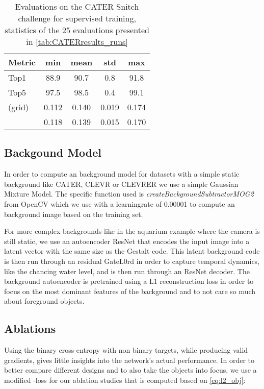 \documentclass{article} \usepackage{iclr2023_conference_arxiv,times}
\begin{document}
\begin{table}[htb]
    \caption{Evaluations on the CATER Snitch challenge for supervised training, statistics of the 25 evaluations presented in \autoref{tab:CATERresults_runs}}
    \centering
    \footnotesize
    \begin{tabularx}{\linewidth}{ l C C C C }
	\toprule
    Metric & min & mean & std & max \\
    \midrule
    Top1 & 88.9 & 90.7 & 0.8 & 91.8 \\
    Top5 & 97.5 & 98.5 & 0.4 & 99.1 \\
     (grid)   &   0.112 & 0.140 & 0.019 & 0.174 \\
       &  0.118 & 0.139 & 0.015 &  0.170 \\
    \bottomrule
    \end{tabularx}
    \label{tab:CATERresults_stats}
\end{table}

\subsection{Backgound Model}\label{app:subsec:background_model}
In order to compute an background model for datasets with a simple static background like CATER, CLEVR or CLEVRER we use a simple Gaussian Mixture Model. The specific function used is \textit{createBackgroundSubtractorMOG2} from OpenCV \cite{opencv_library} which we use with a learningrate of 0.00001 to compute an background image based on the training set.

For more complex backgrounds like in the aquarium example where the camera is still static, we use an autoencoder ResNet that encodes the input image into a latent vector with the same size as the Gestalt code. This latent background code is then run through an residual GateL0rd in order to capture temporal dynamics, like the chancing water level, and is then run through an ResNet decoder.
The background autoencoder is pretrained using a L1 reconstruction loss in order to focus on the most dominant features of the background and to not care so much about foreground objects.




\subsection{Ablations}\label{ablations}

Using the binary cross-entropy with non binary targets, while producing valid gradients, gives little insights into the network's actual performance.
In order to better compare different designs and to also take the objects into focus, we use a modified -loss for our ablation studies that is computed based on \autoref{eq:l2_obj}:
\end{document}
